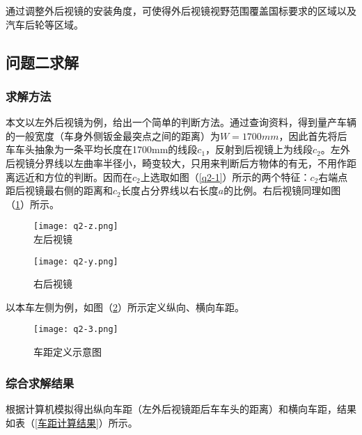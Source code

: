 \documentclass[withoutpreface,bwprint]{cumcmthesis} %
\begin{document}
\par 通过调整外后视镜的安装角度，可使得外后视镜视野范围覆盖国标要求的区域以及汽车后轮等区域。
 
\subsection{问题二求解}
\subsubsection{求解方法}

\par 本文以左外后视镜为例，给出一个简单的判断方法。通过查询资料，得到量产车辆的一般宽度（车身外侧钣金最突点之间的距离）为$W=1700mm$，因此首先将后车车头抽象为一条平均长度在1700mm的线段$c_1$，反射到后视镜上为线段$c_2$。左外后视镜分界线以左曲率半径小，畸变较大，只用来判断后方物体的有无，不用作距离远近和方位的判断。因而在$c_2$上选取如图（\ref{q2-1}）所示的两个特征：$c_2$右端点距后视镜最右侧的距离和$c_2$长度占分界线以右长度$a$的比例。右后视镜同理如图（\ref{q2-2}）所示。

\begin{figure}[!htbp]  
\begin{minipage}[t]{0.5\textwidth}
\centering  
\texttt{[image: q2-z.png]} \\
\caption{左后视镜} \label{q2-1}
\end{minipage}
\hspace{1ex}
\begin{minipage}[t]{0.5\textwidth}  
\centering  
\texttt{[image: q2-y.png]}\\
\caption{右后视镜}  \label{q2-2}
\end{minipage}  
\end{figure} 

\par 以本车左侧为例，如图（\ref{q2-3}）所示定义纵向、横向车距。

\begin{figure}[!htbp]
\small
\centering
\texttt{[image: q2-3.png]}
\caption{车距定义示意图} \label{q2-3}
\end{figure}


\subsubsection{综合求解结果}

\par 根据计算机模拟得出纵向车距（左外后视镜距后车车头的距离）和横向车距，结果如表（\ref{车距计算结果}）所示。
\end{document}
